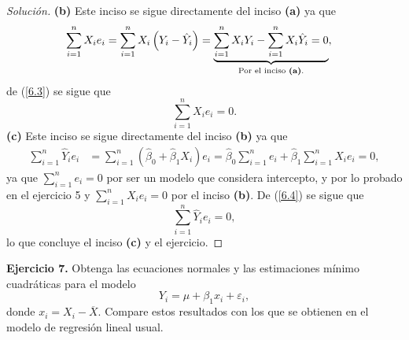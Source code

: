 \documentclass[10.5pt,notitlepage]{article}
\newenvironment{solucion}
  {\begin{proof}[Solución]}
  {\end{proof}}
\newcommand{\ee}{\varepsilon}
\newcommand{\pare}[1]{\left( #1 \right)}
\begin{document}
\begin{solucion}
\noindent \textbf{(b)} Este inciso se sigue directamente del inciso \textbf{(a)} ya que
\begin{align}
    \sum_{i = 1}^{n}X_ie_i &=\sum_{i = 1}^{n}X_i\pare{Y_i - \hat{Y}_i} =\underbrace{\sum_{i = 1}^{n}X_iY_i -\sum_{i = 1}^{n}X_i\hat{Y}_i = 0}_{\text{\shortstack{Por el inciso \textbf{(a)}.}}},  \label{6.3}
\end{align}
de (\ref{6.3}) se sigue que
\[
\sum_{i = 1}^{n}X_ie_i = 0.
\]
\noindent \textbf{(c)} Este inciso se sigue directamente del inciso \textbf{(b)} ya que
\begin{align}
    \sum_{i=1}^{n}\hat{Y}_i e_i &= \sum_{i=1}^{n}(\hat{\beta}_0 + \hat{\beta}_1 X_i) e_i = \hat{\beta}_0\sum_{i=1}^{n}e_i +  \hat{\beta}_1\sum_{i=1}^{n} X_i e_i = 0,\label{6.4}
\end{align}
ya que \(\sum_{i=1}^{n}e_i = 0\) por ser un modelo que considera intercepto, y por lo probado en el ejercicio 5 y \(\sum_{i=1}^{n} X_i e_i = 0\) por el inciso \textbf{(b)}. 
De (\ref{6.4}) se sigue que 
\[ 
 \sum_{i=1}^{n}\hat{Y}_i e_i = 0, 
\]
lo que concluye el inciso \textbf{(c)} y el ejercicio. 
\end{solucion}
\noindent \textbf{Ejercicio 7.} Obtenga las ecuaciones normales y las estimaciones mínimo cuadráticas para el modelo 
\begin{equation}
    Y_i = \mu + \beta_1 x_i + \ee_i,
\end{equation}
donde \(x_i = X_i - \overline{X}.\) Compare estos resultados con los que se obtienen en el modelo de regresión lineal usual.
\end{document}
